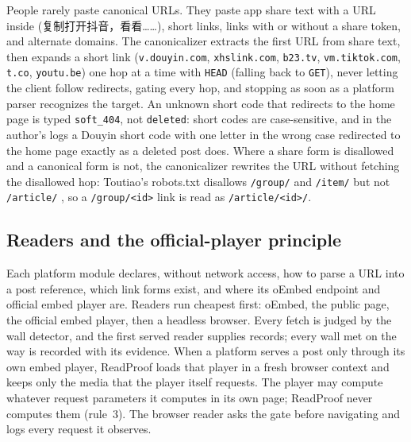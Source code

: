 \documentclass[11pt]{article}
\newcommand{\zh}[1]{#1}
\DeclareRobustCommand{\zh}[1]{\begin{CJK}{UTF8}{gbsn}#1\end{CJK}}
\newcommand{\wt}[1]{\texttt{#1}}%
\begin{document}
People rarely paste canonical URLs. They paste app share text with a URL inside (\zh{复制打开抖音，看看……}),
short links, links with or without a share token, and alternate domains. The canonicalizer extracts the
first URL from share text, then expands a short link (\texttt{v.douyin.com}, \texttt{xhslink.com},
\texttt{b23.tv}, \texttt{vm.tiktok.com}, \texttt{t.co}, \texttt{youtu.be}) one hop at a time with
\texttt{HEAD} (falling back to \texttt{GET}), never letting the client follow redirects, gating every hop, and
stopping as soon as a platform parser recognizes the target. An unknown short code that redirects to the home
page is typed \wt{soft\_404}, not \wt{deleted}: short codes are case-sensitive, and in the author's logs a
Douyin short code with one letter in the wrong case redirected to the home page exactly as a deleted post
does. Where a share form is disallowed and a canonical form is
not, the canonicalizer rewrites the URL without fetching the disallowed hop: Toutiao's robots.txt disallows
\texttt{/group/} and \texttt{/item/} but not \texttt{/article/} \citep{robots2026toutiao}, so a
\texttt{/group/<id>} link is read as \texttt{/article/<id>/}.

\subsection{Readers and the official-player principle}
Each platform module declares, without network access, how to parse a URL into a post reference, which link
forms exist, and where its oEmbed endpoint and official embed player are. Readers run cheapest first:
oEmbed, the public page, the official embed player, then a headless browser. Every fetch is judged by the wall
detector, and the first served reader supplies records; every wall met on the way is recorded with its
evidence. When a platform serves a post only through its own embed player, ReadProof loads that player in a
fresh browser context and keeps only the media that the player itself requests. The player may compute
whatever request parameters it computes in its own page; ReadProof never computes them (rule~3). The browser
reader asks the gate before navigating and logs every request it observes.
\end{document}
